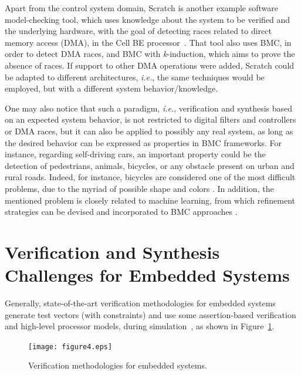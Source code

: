 \documentclass[format=acmsmall, review=false, screen=true]{acmart}
\begin{document}
Apart from the control system domain, Scratch is another example software model-checking tool, which uses knowledge about the system to be verified and the underlying hardware, with the goal of detecting races related to direct memory access (DMA), in the Cell BE processor~\cite{Donaldson10}. That tool also uses BMC, in order to detect DMA races, and BMC with \textit{k}-induction, which aims to prove the absence of races. If support to other DMA operations were added, Scratch could be adapted to different architectures, {\it i.e.}, the same techniques would be employed, but with a different system behavior/knowledge.

One may also notice that such a paradigm, {\it i.e.}, verification and synthesis based on an expected system behavior, is not restricted to digital filters and controllers or DMA races, but it can also be applied to possibly any real system, as long as the desired behavior can be expressed as properties in BMC frameworks. For instance, regarding self-driving cars, an important property could be the detection of pedestrians, animals, bicycles, or any obstacle present on urban and rural roads. Indeed, for instance, bicycles are considered one of the most difficult problems, due to the myriad of possible shape and colors \cite{selfcar}. In addition, the mentioned problem is closely related to machine learning, from which refinement strategies can be devised and incorporated to BMC approaches \cite{BMCml}. 


\section{Verification and Synthesis \\ Challenges for Embedded Systems}
\label{Verification-Challenges} 

Generally, state-of-the-art verification methodologies for embedded systems generate test vectors (with constraints) and use some assertion-based verification and high-level processor models, during simulation~\cite{Behrend15,Lettnin09}, as shown in Figure~\ref{verification-methodologies}. 
%
\begin{figure}[h]
	\centering
	\texttt{[image: figure4.eps]}
	\caption{Verification methodologies for embedded systems.}
	\label{verification-methodologies}
\end{figure}
\end{document}
